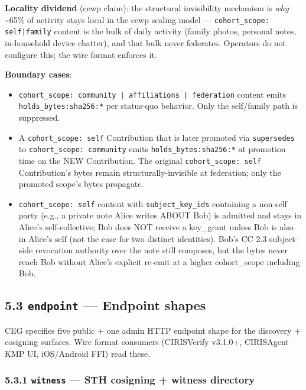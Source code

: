 \documentclass[11pt]{article}
\begin{document}
\textbf{Locality dividend} (cewp claim): the structural invisibility mechanism is \textit{why} \textasciitilde{}65\% of activity stays local in the cewp scaling model — \texttt{cohort\_scope: self|family} content is the bulk of daily activity (family photos, personal notes, in-household device chatter), and that bulk never federates. Operators do not configure this; the wire format enforces it.


\textbf{Boundary cases}:


\begin{itemize}\setlength\itemsep{0pt}
\item \texttt{cohort\_scope: community | affiliations | federation} content emits \texttt{holds\_bytes:sha256:*} per status-quo behavior. Only the self/family path is suppressed.
\item A \texttt{cohort\_scope: self} Contribution that is later promoted via \texttt{supersedes} to \texttt{cohort\_scope: community} emits \texttt{holds\_bytes:sha256:*} at promotion time on the NEW Contribution. The original \texttt{cohort\_scope: self} Contribution's bytes remain structurally-invisible at federation; only the promoted scope's bytes propagate.
\item \texttt{cohort\_scope: self} content with \texttt{subject\_key\_ids} containing a non-self party (e.g., a private note Alice writes ABOUT Bob) is admitted and stays in Alice's self-collective; Bob does NOT receive a key\_grant unless Bob is also in Alice's self (not the case for two distinct identities). Bob's CC 2.3 subject-side revocation authority over the note still composes, but the bytes never reach Bob without Alice's explicit re-emit at a higher cohort\_scope including Bob.
\end{itemize}


\subsection*{5.3 \texttt{endpoint} — Endpoint shapes}


CEG specifies five public + one admin HTTP endpoint shape for the discovery + cosigning surfaces. Wire format consumers (CIRISVerify v3.1.0+, CIRISAgent KMP UI, iOS/Android FFI) read these.


\subsubsection*{5.3.1 \texttt{witness} — STH cosigning + witness directory}
\end{document}
